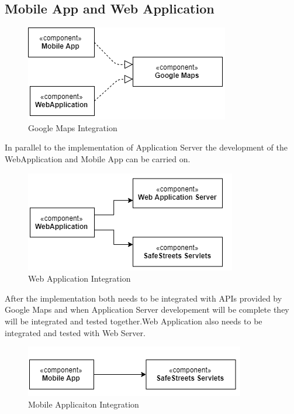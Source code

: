 \subsection{Mobile App and Web Application}
\begin{figure}[H]
\centering
\includegraphics{Images/IntegrationMaps.png}
\caption{\label{fig:ComWI}Google Maps Integration}
\end{figure}
In parallel to the implementation of Application Server the development of the WebApplication and Mobile App can be carried on.
\begin{figure}[H]
\centering
\includegraphics{Images/IntegrationWeb.png}
\caption{\label{fig:ComWI}Web Application Integration}
\end{figure}
After the implementation both needs to be integrated with APIs provided by Google Maps and when Application Server developement will be complete they will be integrated and tested together.Web Application also needs to be integrated and tested with Web Server.
\begin{figure}[H]
\centering
\includegraphics{Images/IntegrationMobile.png}
\caption{\label{fig:ComWI}Mobile Applicaiton Integration}
\end{figure}
\newpage
